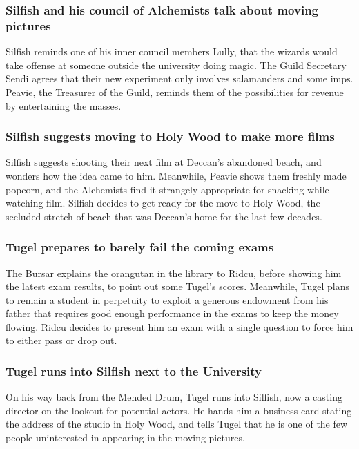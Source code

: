 \subsubsection{\Gls{Silfish} and his council of Alchemists talk about moving pictures}
\Gls{Silfish} reminds one of his inner council members \Gls{Lully}, that the wizards would take
offense at someone outside the university doing magic. The Guild Secretary \Gls{Sendi} agrees that
their new experiment only involves salamanders and some imps. \Gls{Peavie}, the Treasurer of the
Guild, reminds them of the possibilities for revenue by entertaining the masses.

\subsubsection{\Gls{Silfish} suggests moving to Holy Wood to make more films}
\Gls{Silfish} suggests shooting their next film at \Gls{Deccan}'s abandoned beach, and wonders
how the idea came to him. Meanwhile, \Gls{Peavie} shows them freshly made popcorn, and the
Alchemists find it strangely appropriate for snacking while watching film. \Gls{Silfish} decides to
get ready for the move to Holy Wood, the secluded stretch of beach that was \Gls{Deccan}'s home for
the last few decades.

\subsubsection{\Gls{Tugel} prepares to barely fail the coming exams}
The \Gls{Bursar} explains the orangutan in the library to \Gls{Ridcu}, before showing him the latest
exam results, to point out some \Gls{Tugel}'s scores. Meanwhile, \Gls{Tugel} plans to remain a
student in perpetuity to exploit a generous endowment from his father that requires good enough
performance in the exams to keep the money flowing. \Gls{Ridcu} decides to present him an exam
with a single question to force him to either pass or drop out.

\subsubsection{\Gls{Tugel} runs into \Gls{Silfish} next to the University}
On his way back from the Mended Drum, \Gls{Tugel} runs into \Gls{Silfish}, now a casting director
on the lookout for potential actors. He hands him a business card stating the address of the studio
in Holy Wood, and tells \Gls{Tugel} that he is one of the few people uninterested in appearing in
the moving pictures.

